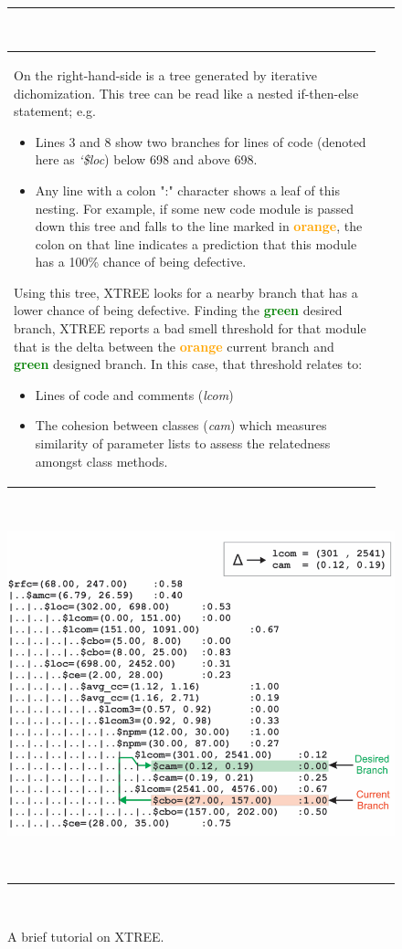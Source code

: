 \documentclass{sig-alternate}
\theoremstyle{break}
\begin{document}
\begin{figure}[!t]
~\hrule~
\begin{minipage}{.53\linewidth}
\small
 \begin{tabular}{p{0.95\linewidth}} 
 On the right-hand-side is a tree
 generated by iterative dichomization. 
 This tree can be read like a nested if-then-else statement; e.g.
 \begin{itemize}
     \item Lines 3 and 8 show two branches for lines of code (denoted here as {\em `\$loc}) below 698 and above 698.
     \item Any line with a colon ":" character shows  a  leaf  of  this  nesting.   For  example,  if  some  new  code module is passed down this tree and falls to the line marked in \textcolor{orange}{{\bf orange}},  the colon on that line indicates a prediction that this module has a 100\% chance of being defective. 
     \end{itemize}
Using this tree,
 XTREE looks for a nearby branch that has a lower chance of being defective. Finding the \textcolor{green}{{\bf green}} desired  branch,  XTREE reports a bad smell threshold for that module that is the delta between the \textcolor{orange}{{\bf orange}}  current branch  and   \textcolor{green}{{\bf green}} designed branch. 
 In this case, that threshold relates to:
 \begin{itemize}
     \item Lines of code and comments ({\em lcom}) 
     \item The cohesion between classes ({\em cam}) which measures similarity of parameter lists to assess the relatedness amongst class   methods.
     \end{itemize}\\ 
 \end{tabular}
 \end{minipage}~~~~
 \begin{minipage}{.45\linewidth}
\includegraphics[width=\linewidth]{figs/XTREE_samp.png}
\end{minipage}
~\hrule~
 \caption{A brief tutorial on XTREE.} \label{fig:xtree_samp}
\end{figure}
\end{document}
